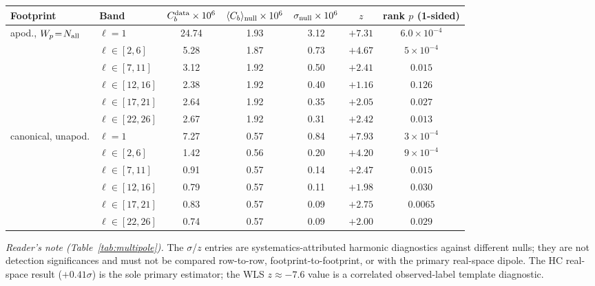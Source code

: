 \documentclass[aps,prd,twocolumn,superscriptaddress,preprintnumbers,nofootinbib,longbibliography,floatfix]{revtex4-2}
\newcommand{\sigmaunit}{\sigma}
\begin{document}
\begin{table}[tbp]
\begin{ruledtabular}
\begin{tabular}{llccccc}
\textbf{Footprint} & \textbf{Band} & \textbf{$C_b^{\rm data} \times 10^{6}$} &
\textbf{$\langle C_b\rangle_{\rm null} \times 10^{6}$} &
\textbf{$\sigma_{\rm null} \times 10^{6}$} &
\textbf{$z$} & \textbf{rank $p$ (1-sided)} \\
\hline
apod., $W_p\!=\!N_{\rm all}$ & $\ell\!=\!1$ & 24.74 & 1.93 & 3.12 & $+7.31$ & $6.0\times10^{-4}$ \\
 & $\ell\!\in\![2,6]$ & 5.28 & 1.87 & 0.73 & $+4.67$ & $5\times10^{-4}$ \\
 & $\ell\!\in\![7,11]$ & 3.12 & 1.92 & 0.50 & $+2.41$ & $0.015$ \\
 & $\ell\!\in\![12,16]$ & 2.38 & 1.92 & 0.40 & $+1.16$ & $0.126$ \\
 & $\ell\!\in\![17,21]$ & 2.64 & 1.92 & 0.35 & $+2.05$ & $0.027$ \\
 & $\ell\!\in\![22,26]$ & 2.67 & 1.92 & 0.31 & $+2.42$ & $0.013$ \\
\hline
canonical, unapod. & $\ell\!=\!1$ & 7.27 & 0.57 & 0.84 & $+7.93$ & $3\times10^{-4}$ \\
 & $\ell\!\in\![2,6]$ & 1.42 & 0.56 & 0.20 & $+4.20$ & $9\times10^{-4}$ \\
 & $\ell\!\in\![7,11]$ & 0.91 & 0.57 & 0.14 & $+2.47$ & $0.015$ \\
 & $\ell\!\in\![12,16]$ & 0.79 & 0.57 & 0.11 & $+1.98$ & $0.030$ \\
 & $\ell\!\in\![17,21]$ & 0.83 & 0.57 & 0.09 & $+2.75$ & $0.0065$ \\
 & $\ell\!\in\![22,26]$ & 0.74 & 0.57 & 0.09 & $+2.00$ & $0.029$ \\
\end{tabular}
\end{ruledtabular}
\end{table}

\noindent\emph{Reader's note (Table~\ref{tab:multipole}).} The $\sigma$/$z$ entries are systematics-attributed harmonic diagnostics against different nulls; they are not detection significances and must not be compared row-to-row, footprint-to-footprint, or with the primary real-space dipole. The HC real-space result ($+0.41\sigmaunit$) is the sole primary estimator; the WLS $z\approx-7.6$ value is a correlated observed-label template diagnostic.
\end{document}
